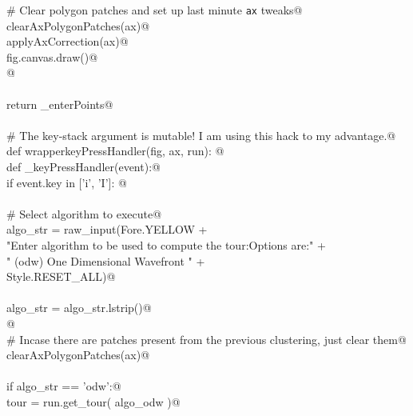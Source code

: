 \documentclass[12.0pt]{report}
\begin{document}
\begin{flushleft}
\begin{list}{}{}
\mbox{}\verb@             # Clear polygon patches and set up last minute \verb|ax| tweaks@\\
\mbox{}\verb@             clearAxPolygonPatches(ax)@\\
\mbox{}\verb@             applyAxCorrection(ax)@\\
\mbox{}\verb@             fig.canvas.draw()@\\
\mbox{}\verb@             @\\
\mbox{}\verb@@\\
\mbox{}\verb@      return _enterPoints@\\
\mbox{}\verb@@\\
\mbox{}\verb@    # The key-stack argument is mutable! I am using this hack to my advantage.@\\
\mbox{}\verb@    def wrapperkeyPressHandler(fig, ax, run): @\\
\mbox{}\verb@           def _keyPressHandler(event):@\\
\mbox{}\verb@               if event.key in ['i', 'I']:  @\\
\mbox{}\verb@@\\
\mbox{}\verb@                    # Select algorithm to execute@\\
\mbox{}\verb@                    algo_str = raw_input(Fore.YELLOW                                             +\@\\
\mbox{}\verb@                            "Enter algorithm to be used to compute the tour:\n Options are:\n"   +\@\\
\mbox{}\verb@                            " (odw)     One Dimensional Wavefront \n"                            +\@\\
\mbox{}\verb@                            Style.RESET_ALL)@\\
\mbox{}\verb@@\\
\mbox{}\verb@                    algo_str = algo_str.lstrip()@\\
\mbox{}\verb@                     @\\
\mbox{}\verb@                    # Incase there are patches present from the previous clustering, just clear them@\\
\mbox{}\verb@                    clearAxPolygonPatches(ax)@\\
\mbox{}\verb@@\\
\mbox{}\verb@                    if   algo_str == 'odw':@\\
\mbox{}\verb@                          tour = run.get_tour( algo_odw )@\\

\end{list}
\end{flushleft}
\end{document}
